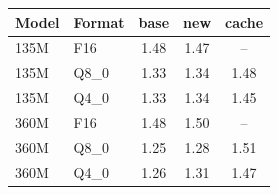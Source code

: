 \begin{tabular}{llccc}
\toprule
Model & Format & base & new & cache\\
\midrule
135M & F16  & 1.48 & 1.47 & --\\
135M & Q8\_0 & 1.33 & 1.34 & 1.48\\
135M & Q4\_0 & 1.33 & 1.34 & 1.45\\
360M & F16  & 1.48 & 1.50 & --\\
360M & Q8\_0 & 1.25 & 1.28 & 1.51\\
360M & Q4\_0 & 1.26 & 1.31 & 1.47\\
\bottomrule
\end{tabular}
